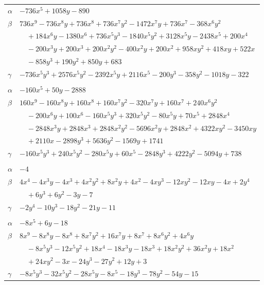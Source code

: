 \documentclass[11pt]{article}
\begin{document}
\begin{longtable}{@{}ll@{}}
$\alpha$ & $-736x^{5}+1058y-890$\\
$\beta$ & $736x^{9}-736x^{8}y+736x^{8}+736x^{7}y^{2}-1472x^{7}y+736x^{7}-368x^{6}y^{2}$\\
 & $\quad +184x^{6}y-1380x^{6}+736x^{5}y^{3}-1840x^{5}y^{2}+3128x^{5}y-2438x^{5}+200x^{4}$\\
 & $\quad -200x^{3}y+200x^{3}+200x^{2}y^{2}-400x^{2}y+200x^{2}+958xy^{2}+418xy+522x$\\
 & $\quad -858y^{3}+190y^{2}+850y+683$\\
$\gamma$ & $-736x^{5}y^{3}+2576x^{5}y^{2}-2392x^{5}y+2116x^{5}-200y^{3}-358y^{2}-1018y-322$\\
\addlinespace[3pt]
\multicolumn{2}{@{}l}{$\{i,j\}=\{12,39\}$, $k_{ij}=2^{4}\cdot 3^{2}$}\\
$\alpha$ & $-160x^{5}+50y-2888$\\
$\beta$ & $160x^{9}-160x^{8}y+160x^{8}+160x^{7}y^{2}-320x^{7}y+160x^{7}+240x^{6}y^{2}$\\
 & $\quad -200x^{6}y+100x^{6}-160x^{5}y^{3}+320x^{5}y^{2}-80x^{5}y+70x^{5}+2848x^{4}$\\
 & $\quad -2848x^{3}y+2848x^{3}+2848x^{2}y^{2}-5696x^{2}y+2848x^{2}+4322xy^{2}-3450xy$\\
 & $\quad +2110x-2898y^{3}+5636y^{2}-1569y+1741$\\
$\gamma$ & $-160x^{5}y^{3}+240x^{5}y^{2}-280x^{5}y+60x^{5}-2848y^{3}+4222y^{2}-5094y+738$\\
\addlinespace[3pt]
\multicolumn{2}{@{}l}{$\{i,j\}=\{13,14\}$, $k_{ij}=2^{2}\cdot 3$}\\
$\alpha$ & $-4$\\
$\beta$ & $4x^{4}-4x^{3}y-4x^{3}+4x^{2}y^{2}+8x^{2}y+4x^{2}-4xy^{3}-12xy^{2}-12xy-4x+2y^{4}$\\
 & $\quad +6y^{3}+6y^{2}-3y-7$\\
$\gamma$ & $-2y^{4}-10y^{3}-18y^{2}-21y-11$\\
\addlinespace[3pt]
\multicolumn{2}{@{}l}{$\{i,j\}=\{13,38\}$, $k_{ij}=3^{2}$}\\
$\alpha$ & $-8x^{5}+6y-18$\\
$\beta$ & $8x^{9}-8x^{8}y-8x^{8}+8x^{7}y^{2}+16x^{7}y+8x^{7}+8x^{6}y^{2}+4x^{6}y$\\
 & $\quad -8x^{5}y^{3}-12x^{5}y^{2}+18x^{4}-18x^{3}y-18x^{3}+18x^{2}y^{2}+36x^{2}y+18x^{2}$\\
 & $\quad +24xy^{2}-3x-24y^{3}-27y^{2}+12y+3$\\
$\gamma$ & $-8x^{5}y^{3}-32x^{5}y^{2}-28x^{5}y-8x^{5}-18y^{3}-78y^{2}-54y-15$\\

\end{longtable}
\end{document}
